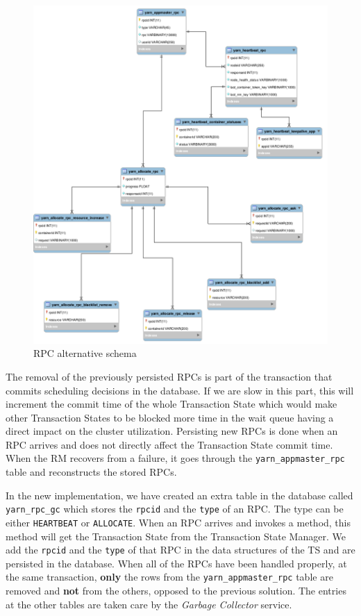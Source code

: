 \begin{figure}
\centering
\includegraphics[scale=0.3]{resources/images/Implementation/rpc_fk_alternate_schema.png}
\caption{RPC alternative schema}
\label{fig:impl_fk_alternate_schema}
\end{figure}

The removal of the previously persisted RPCs is part of the
transaction that commits scheduling decisions in the database. If we
are slow in this part, this will increment the commit time of the
whole Transaction State which would make other Transaction States to
be blocked more time in the wait queue having a direct impact on the
cluster utilization. Persisting new RPCs is done when an RPC arrives
and does not directly affect the Transaction State commit time. When
the RM recovers from a failure, it goes through the
\texttt{yarn\_appmaster\_rpc} table and reconstructs the stored RPCs.

In the new implementation, we have created an extra table in the
database called \texttt{yarn\_rpc\_gc} which stores the \texttt{rpcid}
and the \texttt{type} of an RPC. The type can be either
\texttt{HEARTBEAT} or \texttt{ALLOCATE}. When an RPC arrives and
invokes a method, this method will get the Transaction State from the
Transaction State Manager. We add the \texttt{rpcid} and the
\texttt{type} of that RPC in the data structures of the TS and are
persisted in the database. When all of the RPCs have been handled
properly, at the same transaction, \textbf{only} the rows from
the \texttt{yarn\_appmaster\_rpc} table are removed and \textbf{not}
from the others, opposed to the previous solution. The entries at the other tables are taken care by the
\emph{Garbage Collector} service.

